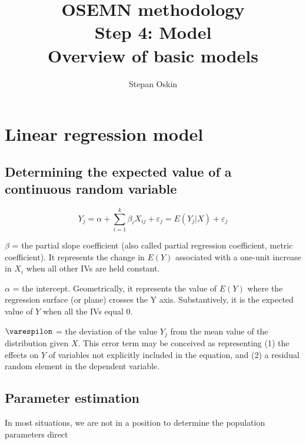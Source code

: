 \documentclass[11pt]{article}
\begin{document}
    \title{OSEMN methodology \\
    Step 4: Model \\
    Overview of basic models}

    \author{Stepan Oskin}

    \maketitle

    \begin{abstract}

    \end{abstract}

    \section{Linear regression model} \label{sec:linear_regression}

    \subsection{Determining the expected value of a continuous random variable} \label{subsec:determining_ev_of_continuous_rv}

    \begin{equation} \label{eq:linear_regression}
        Y_j = \alpha + \sum \limits_{i=1}^k \beta_i X_{ij} + \varepsilon_j = E(Y_j|X) + \varepsilon_j
    \end{equation}

    $\beta$ = the partial slope coefficient (also called partial regression coefficient, metric coefficient).
    It represents the change in $E(Y)$ associated with a one-unit increase in $X_i$ when all other IVs are held constant.

    $\alpha$ = the intercept.
    Geometrically, it represents the value of $E(Y)$ where the regression surface (or plane) crosses the Y axis.
    Substantively, it is the expected value of $Y$ when all the IVs equal 0.

    $\varespilon$ = the deviation of the value $Y_j$ from the mean value of the distribution given $X$.
    This error term may be conceived as representing (1) the effects on $Y$ of variables not explicitly included in the equation, and (2) a residual random element in the dependent variable.

    \subsection{Parameter estimation} \label{subsec:lr_parameter_estimation}

    In most situations, we are not in a position to determine the population parameters direct

    
    
\end{document}

